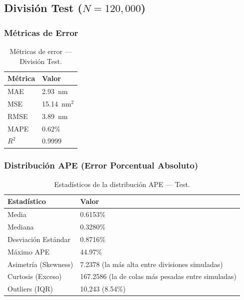 \documentclass{article}
\begin{document}
\subsection{División Test ($N = 120{,}000$)}

\subsubsection{Métricas de Error}

\begin{table}[htbp]
\centering
\caption{Métricas de error — División Test.}
\label{tab:test-metrics}
\begin{tabular}{ll}
\hline
Métrica & Valor \\
\hline
MAE  & 2.93~nm \\
MSE  & 15.14~nm$^2$ \\
RMSE & 3.89~nm \\
MAPE & 0.62\% \\
$R^2$ & 0.9999 \\
\hline
\end{tabular}
\end{table}

\subsubsection{Distribución APE (Error Porcentual Absoluto)}

\begin{table}[htbp]
\centering
\caption{Estadísticos de la distribución APE — Test.}
\label{tab:test-ape}
\begin{tabular}{ll}
\hline
Estadístico & Valor \\
\hline
Media                    & 0.6153\% \\
Mediana                  & 0.3280\% \\
Desviación Estándar      & 0.8716\% \\
Máximo APE               & 44.97\% \\
Asimetría (Skewness)     & 7.2378 (la más alta entre divisiones simuladas) \\
Curtosis (Exceso)        & 167.2586 (la de colas más pesadas entre simuladas) \\
Outliers (IQR)           & 10,243 (8.54\%) \\
\hline
\end{tabular}
\end{table}
\end{document}
